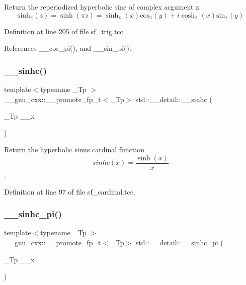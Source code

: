 Return the reperiodized hyperbolic sine of complex argument z\+: \[ \mathrm{sinh_\pi}(z) = \sinh(\pi z) = \mathrm{\sinh_\pi}(x) \mathrm{cos_\pi}(y) + i \mathrm{\cosh_\pi}(x) \mathrm{sin_\pi}(y) \] 

Definition at line 205 of file sf\+\_\+trig.\+tcc.



References \+\_\+\+\_\+cos\+\_\+pi(), and \+\_\+\+\_\+sin\+\_\+pi().

\mbox{\label{namespacestd_1_1____detail_a542bbc5f25643898444c02fbaec5c820}} 
\subsubsection{\texorpdfstring{\+\_\+\+\_\+sinhc()}{\_\_sinhc()}}
{\footnotesize\ttfamily template$<$typename \+\_\+\+Tp $>$ \\
\+\_\+\+\_\+gnu\+\_\+cxx\+::\+\_\+\+\_\+promote\+\_\+fp\+\_\+t$<$\+\_\+\+Tp$>$ std\+::\+\_\+\+\_\+detail\+::\+\_\+\+\_\+sinhc (\begin{DoxyParamCaption}\item[{\+\_\+\+Tp}]{\+\_\+\+\_\+x }\end{DoxyParamCaption})}



Return the hyperbolic sinus cardinal function \[ sinhc(x) = \frac{\sinh(x)}{x} \]. 



Definition at line 97 of file sf\+\_\+cardinal.\+tcc.

\mbox{\label{namespacestd_1_1____detail_adcb7d17819902a9b4fa0bd5543dd3f6b}} 
\subsubsection{\texorpdfstring{\+\_\+\+\_\+sinhc\+\_\+pi()}{\_\_sinhc\_pi()}}
{\footnotesize\ttfamily template$<$typename \+\_\+\+Tp $>$ \\
\+\_\+\+\_\+gnu\+\_\+cxx\+::\+\_\+\+\_\+promote\+\_\+fp\+\_\+t$<$\+\_\+\+Tp$>$ std\+::\+\_\+\+\_\+detail\+::\+\_\+\+\_\+sinhc\+\_\+pi (\begin{DoxyParamCaption}\item[{\+\_\+\+Tp}]{\+\_\+\+\_\+x }\end{DoxyParamCaption})}



